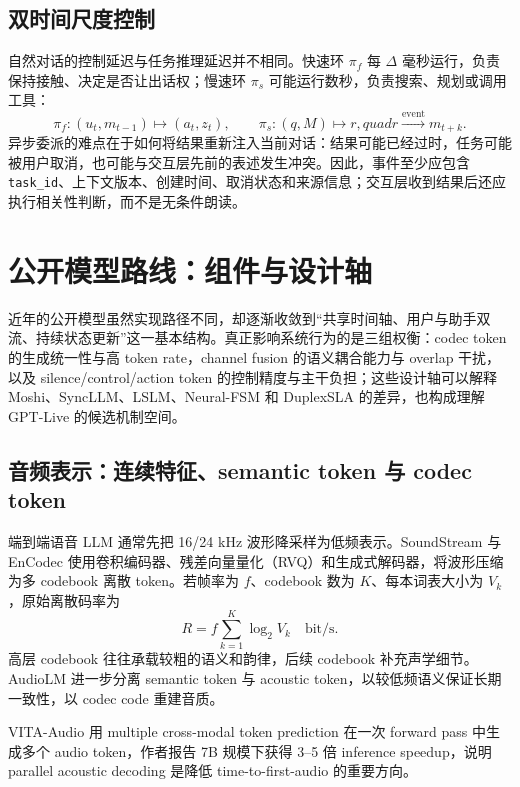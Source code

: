\documentclass[UTF8,fontset=none,a4paper,10pt]{ctexart}
\begin{document}
\subsection{双时间尺度控制}

自然对话的控制延迟与任务推理延迟并不相同。快速环 $\pi_f$ 每 $\Delta$ 毫秒运行，负责保持接触、决定是否让出话权；慢速环 $\pi_s$ 可能运行数秒，负责搜索、规划或调用工具：
\begin{equation}
\pi_f:(u_t,m_{t-1})\mapsto(a_t,z_t),\qquad
\pi_s:(q,M)\mapsto r,quad r\xrightarrow{\mathrm{event}}m_{t+k}.
\end{equation}
异步委派的难点在于如何将结果重新注入当前对话：结果可能已经过时，任务可能被用户取消，也可能与交互层先前的表述发生冲突。因此，事件至少应包含 \texttt{task\_id}、上下文版本、创建时间、取消状态和来源信息；交互层收到结果后还应执行相关性判断，而不是无条件朗读。

\section{公开模型路线：组件与设计轴}

近年的公开模型虽然实现路径不同，却逐渐收敛到“共享时间轴、用户与助手双流、持续状态更新”这一基本结构。真正影响系统行为的是三组权衡：codec token 的生成统一性与高 token rate，channel fusion 的语义耦合能力与 overlap 干扰，以及 silence/control/action token 的控制精度与主干负担；这些设计轴可以解释 Moshi、SyncLLM、LSLM、Neural-FSM 和 DuplexSLA 的差异，也构成理解 GPT-Live 的候选机制空间。

\subsection{音频表示：连续特征、semantic token 与 codec token}

端到端语音 LLM 通常先把 16/24 kHz 波形降采样为低频表示。SoundStream 与 EnCodec 使用卷积编码器、残差向量量化（RVQ）和生成式解码器，将波形压缩为多 codebook 离散 token\cite{zeghidour2021soundstream,defossez2022encodec}。若帧率为 $f$、codebook 数为 $K$、每本词表大小为 $V_k$，原始离散码率为
\begin{equation}
R=f\sum_{k=1}^{K}\log_2V_k\quad\text{bit/s}.
\end{equation}
高层 codebook 往往承载较粗的语义和韵律，后续 codebook 补充声学细节。AudioLM 进一步分离 semantic token 与 acoustic token，以较低频语义保证长期一致性，以 codec code 重建音质\cite{borsos2022audiolm}。

VITA-Audio 用 multiple cross-modal token prediction 在一次 forward pass 中生成多个 audio token，作者报告 7B 规模下获得 3--5 倍 inference speedup\cite{long2025vitaaudio}，说明 parallel acoustic decoding 是降低 time-to-first-audio 的重要方向。
\end{document}
